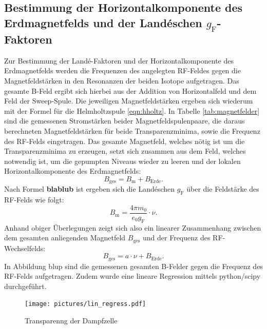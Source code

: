 \subsection{Bestimmung der Horizontalkomponente des Erdmagnetfelds und der Landéschen $g_{\mathrm{F}}$-Faktoren}
Zur Bestimmung der Landé-Faktoren und der Horizontalkomponente des Erdmagnetfelds werden die Frequenzen des angelegten RF-Feldes gegen die Magnetfeldstärken in den Resonanzen der beiden Isotope aufgetragen.
Das gesamte B-Feld ergibt sich hierbei aus der Addition von Horizontalfeld und dem Feld der Sweep-Spule.
Die jeweiligen Magnetfeldstärken ergeben sich wiederum mit der Formel für die Helmholtzspule \ref{eqn:hholtz}.
In Tabelle \ref{tab:magnetfelder} sind die gemessenen Stromstärken beider Magnetfeldspulenpaare, die daraus berechneten Magnetfeldstärken für beide Transparenzminima, sowie die Frequenz des RF-Felds eingetragen.
Das gesamte Magnetfeld, welches nötig ist um die Transparenzminima zu erzeugen, setzt sich zusammen aus dem Feld, welches notwendig ist, um die gepumpten Niveaus wieder zu leeren und der lokalen Horizontalkomponente des Erdmagnetfelds:
\begin{equation}
B_{\mathrm{ges}}=B_{\mathrm{m}}+B_{\mathrm{Erde}}\mathrm{.}
\end{equation}
Nach Formel \textbf{blablub} ist ergeben sich die Landéschen $g_{\mathrm{F}}$ über die Feldstärke des RF-Felds wie folgt:
\begin{equation}
  B_{\mathrm{m}}=\frac{4\pi m_0}{e_0 g_{\mathrm{F}}}\cdot \nu \mathrm{.}
\end{equation}
Anhand obiger Überlegungen zeigt sich also ein linearer Zusammenhang zwischen dem gesamten anliegenden Magnetfeld $B_{\mathrm{ges}}$ und der Frequenz des RF-Wechselfelds:
\begin{equation}
    B_{\mathrm{ges}}=a\cdot \nu+B_{\mathrm{Erde}} \mathrm{.}
\end{equation}
In Abbildung blup sind die gemessenen gesamten B-Felder gegen die Frequenz des RF-Felds aufgetragen. Zudem wurde eine lineare Regression mittels python/scipy \cite{scipy} durchgeführt.
\begin{figure}
  \centering
  \texttt{[image: pictures/lin\_regress.pdf]}
  \caption{Transparenng der Dampfzelle}
  \label{fig:regress}
\end{figure}


